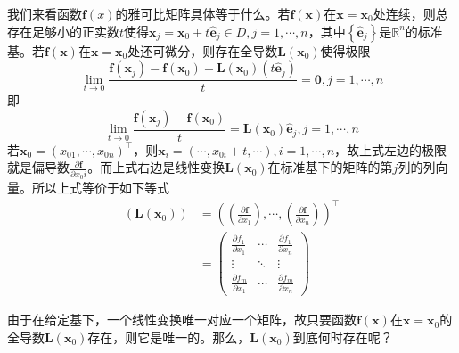 \documentclass[main.tex]{subfiles}
\begin{document}
我们来看函数$\mathbf{f}\left(x\right)$的雅可比矩阵具体等于什么。若$\mathbf{f}\left(\mathbf{x}\right)$在$\mathbf{x}=\mathbf{x}_0$处连续，则总存在足够小的正实数$t$使得$\mathbf{x}_j=\mathbf{x}_0+t\mathbf{\hat{e}}_j\in D,j=1,\cdots,n$，其中$\left\{\mathbf{\hat{e}}_j\right\}$是$\mathbb{R}^n$的标准基。若$\mathbf{f}\left(\mathbf{x}\right)$在$\mathbf{x}=\mathbf{x}_0$处还可微分，则存在全导数$\mathbf{L}\left(\mathbf{x}_0\right)$使得极限
\[\lim_{t\to 0}\frac{\mathbf{f}\left(\mathbf{x}_j\right)-\mathbf{f}\left(\mathbf{x}_0\right)-\mathbf{L}\left(\mathbf{x}_0\right)\left(t\mathbf{\hat{e}}_j\right)}{t}=\mathbf{0},j=1,\cdots,n
\]
即
\[
\lim_{t\to 0}\frac{\mathbf{f}\left(\mathbf{x}_j\right)-\mathbf{f}\left(\mathbf{x}_0\right)}{t}=\mathbf{L}\left(\mathbf{x}_0\right)\mathbf{\hat{e}}_j,j=1,\cdots,n
\]
若$\mathbf{x}_0=\left(x_{01},\cdots,x_{0n}\right)^\intercal$，则$\mathbf{x}_i=\left(\cdots,x_{0i}+t,\cdots\right),i=1,\cdots,n$，故上式左边的极限就是偏导数$\frac{\partial\mathbf{f}}{\partial x_0i}$。而上式右边是线性变换$\mathbf{L}\left(\mathbf{x}_0\right)$在标准基下的矩阵的第$j$列的列向量。所以上式等价于如下等式
\begin{align*}
    \left(\mathbf{L}\left(\mathbf{x}_0\right)\right)&=\left(\left(\frac{\partial\mathbf{f}}{\partial x_1}\right),\cdots,\left(\frac{\partial\mathbf{f}}{\partial x_n}\right)\right)^\intercal\\
    &=\left(\begin{array}{ccc}
    \frac{\partial f_1}{\partial x_1}&\cdots&\frac{\partial f_1}{\partial x_n}\\
    \vdots&\ddots&\vdots\\
    \frac{\partial f_m}{\partial x_1}&\cdots&\frac{\partial f_m}{\partial x_n}
    \end{array}\right)
\end{align*}

由于在给定基下，一个线性变换唯一对应一个矩阵，故只要函数$\mathbf{f}\left(\mathbf{x}\right)$在$\mathbf{x}=\mathbf{x}_0$的全导数$\mathbf{L}\left(\mathbf{x}_0\right)$存在，则它是唯一的。那么，$\mathbf{L}\left(\mathbf{x}_0\right)$到底何时存在呢？
\end{document}
